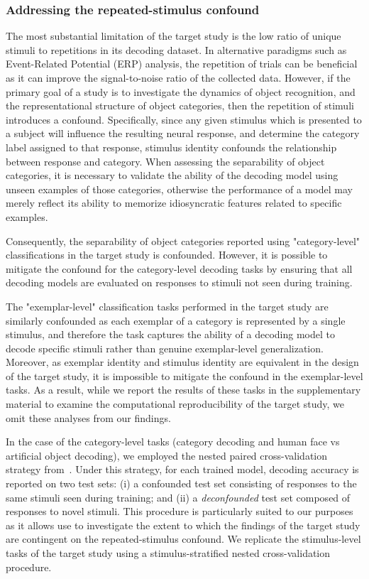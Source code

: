 \subsubsection{Addressing the repeated-stimulus confound}
The most substantial limitation of the target study is the low ratio of unique stimuli to repetitions in its decoding dataset. In alternative paradigms such as Event-Related Potential (ERP) analysis, the repetition of trials can be beneficial as it can improve the signal-to-noise ratio of the collected data. However, if the primary goal of a study is to investigate the dynamics of object recognition, and the representational structure of object categories, then the repetition of stimuli introduces a confound. Specifically, since any given stimulus which is presented to a subject will influence the resulting neural response, and determine the category label assigned to that response, stimulus identity confounds the relationship between response and category. When assessing the separability of object categories, it is necessary to validate the ability of the decoding model using unseen examples of those categories, otherwise the performance of a model may merely reflect its ability to memorize idiosyncratic features related to specific examples. 

Consequently, the separability of object categories reported using "category-level" classifications in the target study is confounded. However, it is possible to mitigate the confound for the category-level decoding tasks by ensuring that all decoding models are evaluated on responses to stimuli not seen during training. 

The "exemplar-level" classification tasks performed in the target study are similarly confounded as each exemplar of a category is represented by a single stimulus, and therefore the task captures the ability of a decoding model to decode specific stimuli rather than genuine exemplar-level generalization. Moreover, as exemplar identity and stimulus identity are equivalent in the design of the target study, it is impossible to mitigate the confound in the exemplar-level tasks. As a result, while we report the  results of these tasks in the supplementary material to examine the computational reproducibility of the target study, we omit these analyses from our findings. 


In the case of the category-level tasks (category decoding and human face vs artificial object decoding), we employed the nested paired cross-validation strategy from~\textcite{Kilgallen:2025}. Under this strategy, for each trained model, decoding accuracy is reported on two test sets: (i) a confounded test set consisting of responses to the same stimuli seen during training; and (ii) a \emph{deconfounded} test set composed of responses to novel stimuli. This procedure is particularly suited to our purposes as it allows use to investigate the extent to which the findings of the target study are contingent on the repeated-stimulus confound. We replicate the stimulus-level tasks of the target study using a stimulus-stratified nested cross-validation procedure. 

